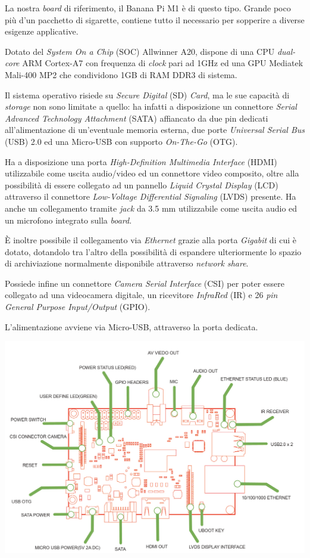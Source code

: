 La nostra \emph{board} di riferimento, il Banana Pi M1 è di questo tipo. Grande 
poco più d'un pacchetto di sigarette, contiene tutto il necessario per 
sopperire a diverse esigenze applicative.

Dotato del \emph{System On a Chip} (SOC) Allwinner A20, dispone di una 
CPU \emph{dual-core} ARM Cortex-A7 con frequenza di 
\textit{clock} pari ad 1GHz ed una GPU
Mediatek Mali-400 MP2 che condividono 1GB di RAM DDR3 di sistema.

Il sistema operativo risiede su \textit{Secure Digital} (SD) \textit{Card}, ma 
le sue capacità di \emph{storage} non sono limitate a quello: ha infatti a 
disposizione un connettore \textit{Serial Advanced Technology Attachment} 
(SATA) affiancato da due pin dedicati all'alimentazione di un'eventuale 
memoria esterna, due porte \textit{Universal Serial Bus} (USB) 2.0 ed una 
Micro-USB con supporto \textit{On-The-Go} (OTG).

Ha a disposizione una porta \textit{High-Definition Multimedia Interface} 
(HDMI) utilizzabile come uscita audio/video ed un connettore video composito, 
oltre alla possibilità di essere collegato ad un pannello \textit{Liquid 
Crystal Display} (LCD) attraverso il connettore \textit{Low-Voltage 
Differential Signaling} (LVDS) presente. Ha anche un collegamento tramite 
\emph{jack} da 3.5 mm utilizzabile come uscita audio ed un microfono integrato 
sulla \emph{board}.

\`E inoltre possibile il collegamento via \textit{Ethernet} grazie alla porta 
\textit{Gigabit} di cui è dotato, dotandolo tra l'altro della possibilità di 
espandere ulteriormente lo spazio di archiviazione normalmente disponibile 
attraverso \emph{network share}.

Possiede infine un connettore \textit{Camera Serial Interface} (CSI) per poter 
essere collegato ad una videocamera digitale, un ricevitore \textit{InfraRed} 
(IR) e 26 \textit{pin} \textit{General Purpose Input/Output} (GPIO).

L'alimentazione avviene via Micro-USB, attraverso la porta dedicata.

\includegraphics[width=1\textwidth]{Figures/bananapi_schema.png}